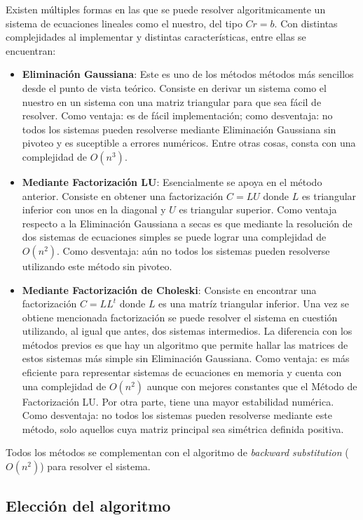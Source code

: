 Existen múltiples formas en las que se puede resolver algoritmicamente un sistema de ecuaciones lineales como el nuestro, del tipo $C r = b$. Con distintas complejidades al implementar y distintas características, entre ellas se encuentran:

\begin{itemize}
    \item \textbf{Eliminación Gaussiana}: Este es uno de los métodos métodos más sencillos desde el punto de vista teórico. Consiste en derivar un sistema como el nuestro en un sistema con una matriz triangular para que sea fácil de resolver. Como ventaja: es de fácil implementación; como desventaja: no todos los sistemas pueden resolverse mediante Eliminación Gaussiana sin pivoteo y es suceptible a errores numéricos. Entre otras cosas, consta con una complejidad de $O(n^3)$.
    \item \textbf{Mediante Factorización LU}: Esencialmente se apoya en el método anterior. Consiste en obtener una factorización $C = LU$ donde $L$ es triangular inferior con unos en la diagonal y $U$ es triangular superior. Como ventaja respecto a la Eliminación Gaussiana a secas es que mediante la resolución de dos sistemas de ecuaciones simples se puede lograr una complejidad de $O(n^2)$. Como desventaja: aún no todos los sistemas pueden resolverse utilizando este método sin pivoteo.
    \item \textbf{Mediante Factorización de Choleski}: Consiste en encontrar una factorización $C = LL^t$ donde $L$ es una matríz triangular inferior. Una vez se obtiene mencionada factorización se puede resolver el sistema en cuestión utilizando, al igual que antes, dos sistemas intermedios. La diferencia con los métodos previos es que hay un algoritmo que permite hallar las matrices de estos sistemas más simple sin Eliminación Gaussiana. Como ventaja: es más eficiente para representar sistemas de ecuaciones en memoria y cuenta con una complejidad de $O(n^2)$ aunque con mejores constantes que el Método de Factorización LU. Por otra parte, tiene una mayor estabilidad numérica. Como desventaja: no todos los sistemas pueden resolverse mediante este método, solo aquellos cuya matriz principal sea simétrica definida positiva.
\end{itemize}

Todos los métodos se complementan con el algoritmo de \textit{backward substitution} ($O(n^2)$) para resolver el sistema.

\subsection{Elección del algoritmo}

